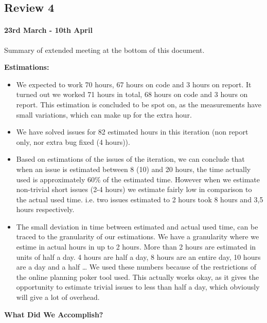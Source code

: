 \subsection{Review 4}
\paragraph{23rd March - 10th April}


Summary of extended meeting at the bottom of this document.

\textbf{Estimations:}
\begin{itemize}
\item We expected to work 70 hours, 67 hours on code and 3 hours on report. It turned out we worked 71 hours in total, 68 hours on code and 3 hours on report. This estimation is concluded to be spot on, as the measurements have small variations, which can make up for the extra hour.
\item We have solved issues for 82 estimated hours in this iteration (non report only, nor extra bug fixed (4 hours)).
\item Based on estimations of the issues of the iteration, we can conclude that when an issue is estimated between 8 (10) and 20 hours, the time actually used is approximately 60\% of the estimated time. However when we estimate non-trivial short issues (2-4 hours) we estimate fairly low in comparison to the actual used time. i.e. two issues estimated to 2 hours took 8 hours and 3,5 hours respectively.
\item The small deviation in time between estimated and actual used time, can be traced to the granularity of our estimations. We have a granularity where we estime in actual hours in up to 2 hours. More than 2 hours are estimated in units of half a day. 4 hours are half a day, 8 hours are an entire day, 10 hours are a day and a half … We used these numbers because of the restrictions of the online planning poker tool used.
This actually works okay, as it gives the opportunity to estimate trivial issues to less than half a day, which obviously will give a lot of overhead.

\end{itemize}
\textbf{What Did We Accomplish?}

